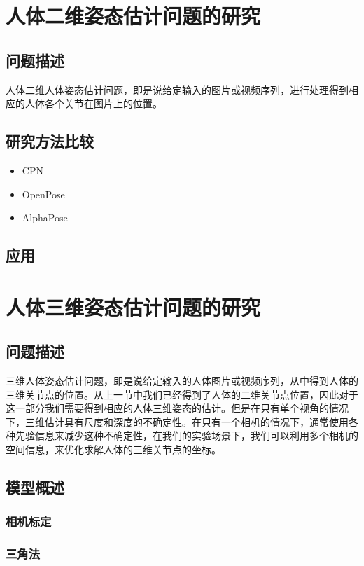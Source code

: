 \section{人体二维姿态估计问题的研究}
\subsection{问题描述}
人体二维人体姿态估计问题，即是说给定输入的图片或视频序列，进行处理得到相应的人体各个关节在图片上的位置。
\subsection{研究方法比较}
\begin{itemize}
    \item CPN 
    \item OpenPose
    \item AlphaPose
\end{itemize}

\subsection{应用}

\section{人体三维姿态估计问题的研究}
\subsection{问题描述}
三维人体姿态估计问题，即是说给定输入的人体图片或视频序列，从中得到人体的三维关节点的位置。从上一节中我们已经得到了人体的二维关节点位置，因此对于这一部分我们需要得到相应的人体三维姿态的估计。但是在只有单个视角的情况下，三维估计具有尺度和深度的不确定性。在只有一个相机的情况下，通常使用各种先验信息来减少这种不确定性，在我们的实验场景下，我们可以利用多个相机的空间信息，来优化求解人体的三维关节点的坐标。

\subsection{模型概述}
\subsubsection{相机标定}
\subsubsection{三角法}

